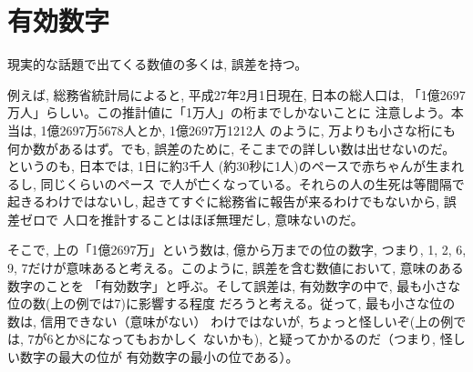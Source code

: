 \mv



\section{有効数字}

現実的な話題で出てくる数値の多くは, 誤差を持つ。

例えば, 総務省統計局によると, 平成27年2月1日現在, 日本の総人口は, 
「1億2697万人」らしい。この推計値に「1万人」の桁までしかないことに
注意しよう。本当は, 1億2697万5678人とか, 1億2697万1212人
のように, 万よりも小さな桁にも何か数があるはず。でも, 誤差のために, 
そこまでの詳しい数は出せないのだ。というのも, 日本では, 1日に約3千人
(約30秒に1人)のペースで赤ちゃんが生まれるし, 同じくらいのペース
で人が亡くなっている。それらの人の生死は等間隔で起きるわけではないし, 
起きてすぐに総務省に報告が来るわけでもないから, 誤差ゼロで
人口を推計することはほぼ無理だし, 意味ないのだ。

そこで, 上の「1億2697万」という数は, 億から万までの位の数字, 
つまり, 1, 2, 6, 9, 7だけが意味あると考える。このように, 
誤差を含む数値において, 意味のある数字のことを
「有効数字」と呼ぶ。そして誤差は, 
有効数字の中で, 最も小さな位の数(上の例では7)に影響する程度
だろうと考える。従って, 最も小さな位の数は, 信用できない（意味がない）
わけではないが, ちょっと怪しいぞ(上の例では, 7が6とか8になってもおかしく
ないかも), と疑ってかかるのだ（つまり, 怪しい数字の最大の位が
有効数字の最小の位である）。\\

